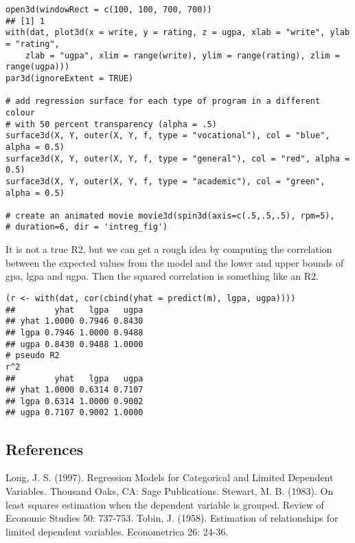 \documentclass[a4paper,12pt]{article}
\begin{document}
\begin{framed}
\begin{verbatim}
open3d(windowRect = c(100, 100, 700, 700))
## [1] 1
with(dat, plot3d(x = write, y = rating, z = ugpa, xlab = "write", ylab = "rating", 
    zlab = "ugpa", xlim = range(write), ylim = range(rating), zlim = range(ugpa)))
par3d(ignoreExtent = TRUE)

# add regression surface for each type of program in a different colour
# with 50 percent transparency (alpha = .5)
surface3d(X, Y, outer(X, Y, f, type = "vocational"), col = "blue", alpha = 0.5)
surface3d(X, Y, outer(X, Y, f, type = "general"), col = "red", alpha = 0.5)
surface3d(X, Y, outer(X, Y, f, type = "academic"), col = "green", alpha = 0.5)

# create an animated movie movie3d(spin3d(axis=c(.5,.5,.5), rpm=5),
# duration=6, dir = 'intreg_fig')
\end{verbatim}
\end{framed}

It is not a true R2, but we can get a rough idea by computing the correlation between the expected values from the model and the lower and upper bounds of gpa, lgpa and ugpa. Then the squared correlation is something like an R2.
\begin{framed}
\begin{verbatim}
(r <- with(dat, cor(cbind(yhat = predict(m), lgpa, ugpa))))
##        yhat   lgpa   ugpa
## yhat 1.0000 0.7946 0.8430
## lgpa 0.7946 1.0000 0.9488
## ugpa 0.8430 0.9488 1.0000
# pseudo R2
r^2
##        yhat   lgpa   ugpa
## yhat 1.0000 0.6314 0.7107
## lgpa 0.6314 1.0000 0.9002
## ugpa 0.7107 0.9002 1.0000

\end{verbatim}
\end{framed}
\subsection{References}
Long, J. S. (1997). Regression Models for Categorical and Limited Dependent Variables. Thousand Oaks, CA: Sage Publications.
Stewart, M. B. (1983). On least squares estimation when the dependent variable is grouped. Review of Economic Studies 50: 737-753.
Tobin, J. (1958). Estimation of relationships for limited dependent variables. Econometrica 26: 24-36.
\end{document}
